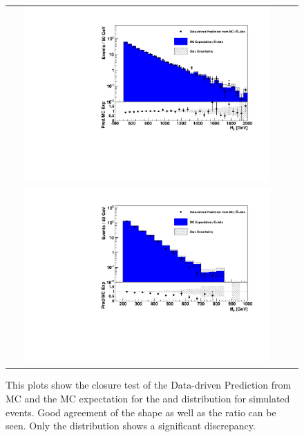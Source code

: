 \begin{figure}[tbhn]
\begin{center}
\begin{tabular}{cc}
\includegraphics[width=0.90\textwidth]{lostlepton/plots/closure/HTttbar.pdf}\\
\includegraphics[width=0.90\textwidth]{lostlepton/plots/closure/MHTttbar.pdf}

\end{tabular}
\end{center}
\caption{This plots show the closure test of the Data-driven Prediction from MC and the MC expectation for the \HT and \MHT distribution for \ttbar simulated events. Good agreement of the shape as well as the ratio can be seen. Only the \MHT distribution shows a significant discrepancy.
}
\label{fig:closure_sepTTbar}
\end{figure}
